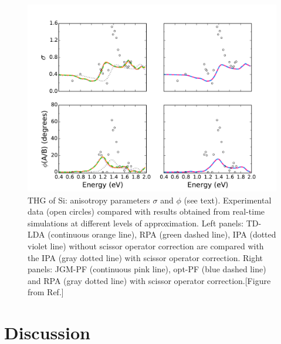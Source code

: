 \begin{figure}[hb]
\centering
\includegraphics[width=1\textwidth]{Figures/anysX3.pdf}
\caption{\footnotesize{THG of Si: anisotropy parameters $\sigma$ and $\phi$ (see text). Experimental data (open circles)\cite{Moss:89} compared with results obtained from real-time simulations at different levels of approximation. Left panels: TD-LDA (continuous orange line), RPA (green dashed line), IPA (dotted violet line) without scissor operator correction are compared with the IPA (gray dotted line) with scissor operator correction. Right panels: JGM-PF (continuous pink line), opt-PF (blue dashed line) and RPA (gray dotted line) with scissor operator correction.[Figure from Ref.\cite{gruningtddf1}] }} \label{fg:siX3an}
\end{figure}

\section{Discussion}

